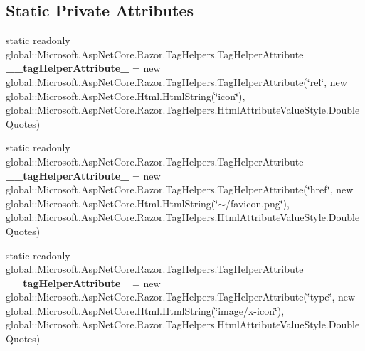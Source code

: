 \subsection*{Static Private Attributes}
\begin{DoxyCompactItemize}
\item 
\mbox{\label{class_asp_net_core_1_1_views___shared____head_af1125833fd18d47d121c73026217c5ec}} 
static readonly global\+::\+Microsoft.\+Asp\+Net\+Core.\+Razor.\+Tag\+Helpers.\+Tag\+Helper\+Attribute {\bfseries \+\_\+\+\_\+tag\+Helper\+Attribute\+\_} = new global\+::\+Microsoft.\+Asp\+Net\+Core.\+Razor.\+Tag\+Helpers.\+Tag\+Helper\+Attribute(\char`\"{}rel\char`\"{}, new global\+::\+Microsoft.\+Asp\+Net\+Core.\+Html.\+Html\+String(\char`\"{}icon\char`\"{}), global\+::\+Microsoft.\+Asp\+Net\+Core.\+Razor.\+Tag\+Helpers.\+Html\+Attribute\+Value\+Style.\+Double\+Quotes)
\item 
\mbox{\label{class_asp_net_core_1_1_views___shared____head_aa08a4b6607f0b559249f02405ed07baa}} 
static readonly global\+::\+Microsoft.\+Asp\+Net\+Core.\+Razor.\+Tag\+Helpers.\+Tag\+Helper\+Attribute {\bfseries \+\_\+\+\_\+tag\+Helper\+Attribute\+\_} = new global\+::\+Microsoft.\+Asp\+Net\+Core.\+Razor.\+Tag\+Helpers.\+Tag\+Helper\+Attribute(\char`\"{}href\char`\"{}, new global\+::\+Microsoft.\+Asp\+Net\+Core.\+Html.\+Html\+String(\char`\"{}$\sim$/favicon.\+png\char`\"{}), global\+::\+Microsoft.\+Asp\+Net\+Core.\+Razor.\+Tag\+Helpers.\+Html\+Attribute\+Value\+Style.\+Double\+Quotes)
\item 
\mbox{\label{class_asp_net_core_1_1_views___shared____head_a213b833445b9f762ac692685e18486e2}} 
static readonly global\+::\+Microsoft.\+Asp\+Net\+Core.\+Razor.\+Tag\+Helpers.\+Tag\+Helper\+Attribute {\bfseries \+\_\+\+\_\+tag\+Helper\+Attribute\+\_} = new global\+::\+Microsoft.\+Asp\+Net\+Core.\+Razor.\+Tag\+Helpers.\+Tag\+Helper\+Attribute(\char`\"{}type\char`\"{}, new global\+::\+Microsoft.\+Asp\+Net\+Core.\+Html.\+Html\+String(\char`\"{}image/x-\/icon\char`\"{}), global\+::\+Microsoft.\+Asp\+Net\+Core.\+Razor.\+Tag\+Helpers.\+Html\+Attribute\+Value\+Style.\+Double\+Quotes)
\item 
\mbox{\label{class_asp_net_core_1_1_views___shared____head_a87470e2aea6b357c0270c2b2d1837dd4}} 

\end{DoxyCompactItemize}
